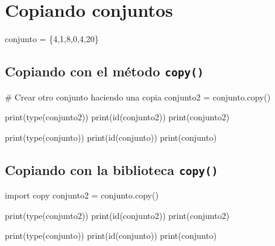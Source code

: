 \documentclass[
  letterpaper,
  DIV=11,
  numbers=noendperiod]{scrreprt}
\newenvironment{Shaded}{\begin{snugshade}}{\end{snugshade}}
\newcommand{\BuiltInTok}[1]{\textcolor[rgb]{0.00,0.23,0.31}{#1}}
\newcommand{\CommentTok}[1]{\textcolor[rgb]{0.37,0.37,0.37}{#1}}
\newcommand{\DecValTok}[1]{\textcolor[rgb]{0.68,0.00,0.00}{#1}}
\newcommand{\ImportTok}[1]{\textcolor[rgb]{0.00,0.46,0.62}{#1}}
\newcommand{\NormalTok}[1]{\textcolor[rgb]{0.00,0.23,0.31}{#1}}
\newcommand{\OperatorTok}[1]{\textcolor[rgb]{0.37,0.37,0.37}{#1}}
\begin{document}
\section{Copiando conjuntos}\label{copiando-conjuntos}

\begin{Shaded}
\begin{Highlighting}[]
\NormalTok{conjunto }\OperatorTok{=}\NormalTok{ \{}\DecValTok{4}\NormalTok{,}\DecValTok{1}\NormalTok{,}\DecValTok{8}\NormalTok{,}\DecValTok{0}\NormalTok{,}\DecValTok{4}\NormalTok{,}\DecValTok{20}\NormalTok{\}}
\end{Highlighting}
\end{Shaded}

\subsection{\texorpdfstring{Copiando con el método
\texttt{copy()}}{Copiando con el método copy()}}\label{copiando-con-el-muxe9todo-copy-1}

\begin{Shaded}
\begin{Highlighting}[]
\CommentTok{\# Crear otro conjunto haciendo una copia}
\NormalTok{conjunto2 }\OperatorTok{=}\NormalTok{ conjunto.copy()}

\BuiltInTok{print}\NormalTok{(}\BuiltInTok{type}\NormalTok{(conjunto2))}
\BuiltInTok{print}\NormalTok{(}\BuiltInTok{id}\NormalTok{(conjunto2))}
\BuiltInTok{print}\NormalTok{(conjunto2)}

\BuiltInTok{print}\NormalTok{(}\BuiltInTok{type}\NormalTok{(conjunto))}
\BuiltInTok{print}\NormalTok{(}\BuiltInTok{id}\NormalTok{(conjunto))}
\BuiltInTok{print}\NormalTok{(conjunto)}
\end{Highlighting}
\end{Shaded}

\subsection{\texorpdfstring{Copiando con la biblioteca
\texttt{copy()}}{Copiando con la biblioteca copy()}}\label{copiando-con-la-biblioteca-copy-1}

\begin{Shaded}
\begin{Highlighting}[]
\ImportTok{import}\NormalTok{ copy}
\NormalTok{conjunto2 }\OperatorTok{=}\NormalTok{ conjunto.copy()}

\BuiltInTok{print}\NormalTok{(}\BuiltInTok{type}\NormalTok{(conjunto2))}
\BuiltInTok{print}\NormalTok{(}\BuiltInTok{id}\NormalTok{(conjunto2))}
\BuiltInTok{print}\NormalTok{(conjunto2)}

\BuiltInTok{print}\NormalTok{(}\BuiltInTok{type}\NormalTok{(conjunto))}
\BuiltInTok{print}\NormalTok{(}\BuiltInTok{id}\NormalTok{(conjunto))}
\BuiltInTok{print}\NormalTok{(conjunto)}
\end{Highlighting}
\end{Shaded}
\end{document}
